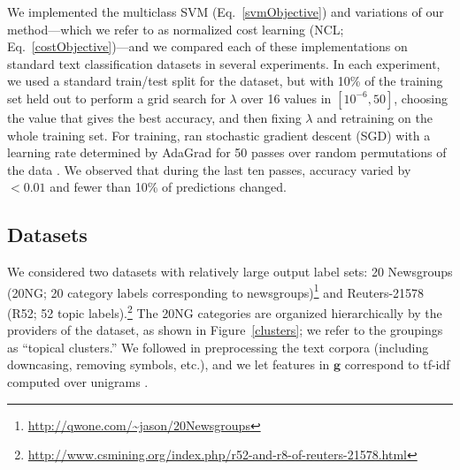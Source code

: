 \documentclass{article} %
\newcommand{\ourmethod}{NCL}
\newcommand{\bmcomment}[1]{\textcolor{blue}{\textsc{\textbf{[#1 --bm]}}}}
\newcommand{\forpubnote}[1]{}
\begin{document}
We implemented the multiclass SVM (Eq.~\ref{svmObjective}) and
variations of our method---which we refer to as
normalized cost learning (\ourmethod{}; Eq.~\ref{costObjective})---and we compared each of these implementations on standard text
classification datasets in several experiments.  In each experiment, 
we used a standard train/test split for the dataset, but with 10\% of
the training set held out to perform a grid search for $\lambda$ over
16 values in $[10^{-6}, 50]$, choosing the value that
gives the best accuracy, and then fixing $\lambda$ and
retraining on the whole training set.  For training,
ran 
stochastic gradient descent (SGD) with a learning rate determined
by AdaGrad for 50 passes over random permutations of the data
\citep{yin2003stochastic,duchi2011adaptive}.  We observed that 
during the last ten
passes, accuracy varied by $<
0.01$ and fewer than 10\% of predictions changed. \forpubnote{
We were running for 150 iterations for previous buggy
versions of the models, but we adjusted down to 50 iterations 
as our remaining working time began to dwindle, and we realized 
that these experiments were going to give negative results.  It's
 unlikely that increasing the number of iterations from 50 will
change the current conclusions, but if this work is ever published,
we might want to rerun the algorithms with more iterations---just 
to be safe.
}

\subsection{Datasets}

We considered two datasets with relatively large output label sets:
20 Newsgroups (20NG; 20 category labels corresponding to newsgroups)\footnote{\url{http://qwone.com/~jason/20Newsgroups}} and Reuters-21578
(R52; 52 topic
labels).\footnote{\url{http://www.csmining.org/index.php/r52-and-r8-of-reuters-21578.html}}    
The 20NG categories are organized hierarchically by the providers of
the dataset, as shown in Figure~\ref{clusters}; we refer to the
groupings as ``topical clusters.''
We followed \citep{2007:phd-Ana-Cardoso-Cachopo} in
preprocessing the text corpora (including downcasing, removing
symbols, etc.), and we let features in $\mathbf{g}$ correspond to tf-idf 
computed over unigrams \citep{lan2006proposing}.
\forpubnote{We also ran experiments
on synthetic data sets, but the results for those experiments are similar
to the results for the text-classification data sets, and 
so they are not included in this document. Specifically, the synthetic data
set results show at most minor performance gains on some versions of the data
although the cost function seems to be learned appropriately.
Furthermore, the synthetic data includes only four features in each task,
which is unrealistic, and causes SGD difficulty in convergence
due to the model's predictions being super sensitive to 
each weight.\bmcomment{Does this make sense?}  In the 
future, it would be 
beneficial
to extend these datasets to include tasks with many more
features,
and use them to make sure our current cost learning models 
are 
functioning properly.
 See the code documentation
at \url{https://github.com/forkunited/CostFunctionLearning/} for more 
detail on how to use and generate the synthetic data.}
\end{document}
